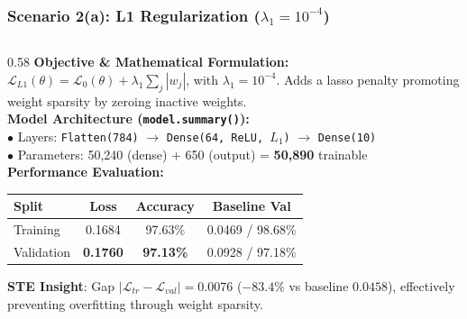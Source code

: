 {
\usebackgroundtemplate{\backgroundcontent}
\begin{frame}
    \frametitle{Scenario 2(a): L1 Regularization ($\lambda_1 = 10^{-4}$)}
    \vspace{-0.30cm}
    \begin{columns}[T]
        \begin{column}{0.58\textwidth}
            \textbf{\scriptsize Objective \& Mathematical Formulation:}\\[1pt]
            {\scriptsize $\mathcal{L}_{L1}(\theta) = \mathcal{L}_0(\theta) + \lambda_1 \sum_{j} |w_j|$, with $\lambda_1 = 10^{-4}$. Adds a lasso penalty promoting weight sparsity by zeroing inactive weights.}\\[3pt]
            
            \textbf{\scriptsize Model Architecture (\texttt{model.summary()}):}\\[1pt]
            {\scriptsize
            $\bullet$ Layers: \texttt{Flatten(784)} $\to$ \texttt{Dense(64, ReLU, $L_1$)} $\to$ \texttt{Dense(10)}\\
            $\bullet$ Parameters: 50,240 (dense) + 650 (output) = \textbf{50,890} trainable
            }\\[3pt]
            
            \textbf{\scriptsize Performance Evaluation:}\\[1pt]
            {\scriptsize
            \setlength{\tabcolsep}{3pt}
            \renewcommand{\arraystretch}{0.90}
            \begin{tabular}{lccc}
                \toprule
                \textbf{Split} & \textbf{Loss} & \textbf{Accuracy} & \textbf{Baseline Val} \\
                \midrule
                Training & 0.1684 & 97.63\% & 0.0469 / 98.68\% \\
                Validation & \textbf{0.1760} & \textbf{97.13\%} & 0.0928 / 97.18\% \\
                \bottomrule
            \end{tabular}
            \par\vspace{2pt}
            \textbf{STE Insight}: Gap $|\mathcal{L}_{tr} - \mathcal{L}_{val}| = \mathbf{0.0076}$ ($-83.4\%$ vs baseline $0.0458$), effectively preventing overfitting through weight sparsity.\par
            }
        \end{column}
        

\end{columns}
\end{frame}}
